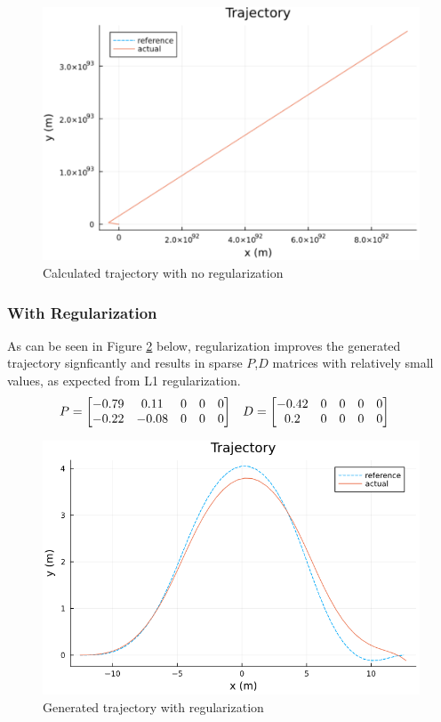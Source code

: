 \documentclass[11pt]{article}
\begin{document}
    \begin{figure}[h!]
        \centering
        \includegraphics[width=0.55\linewidth]{img/trajectory_pd_noreg}
        \caption{Calculated trajectory with no regularization}
        \label{fig:trajectorypdnoreg}
    \end{figure}
    
    \pagebreak
    
    \subsubsection{With Regularization} \label{sec:results:singletraj:wreg}
    As can be seen in Figure \ref{fig:trajectorypdreg} below, regularization improves the generated trajectory signficantly and results in sparse $P $,$ D$ matrices with relatively small values, as expected from L1 regularization. 
        \begin{align*}
            P &= \begin{bmatrix}-0.79 & 0.11 & 0 & 0 & 0 \\ -0.22 & -0.08 & 0 & 0 & 0\end{bmatrix} &
            D &= \begin{bmatrix}-0.42 & 0 & 0 & 0 & 0 \\  0.2 & 0 & 0 & 0 & 0\end{bmatrix}
        \end{align*}
    
    \begin{figure}[h!]
        \centering
        \includegraphics[width=0.6\linewidth]{img/trajectory_pd_reg}
        \caption{Generated trajectory with regularization}
        \label{fig:trajectorypdreg}
    \end{figure}
    
\end{document}
